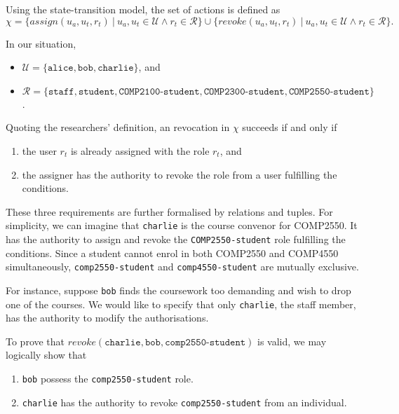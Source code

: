 \documentclass{article}
\begin{document}
Using the state-transition model, the set of actions\cite{formal-verification}
is defined as $$\chi = \{ \textit{assign}(u_{a}, u_{t}, r_{t})\ |\ u_{a}, u_{t}
\in \mathcal{U} \land r_{t} \in \mathcal{R} \} \cup \{ \textit{revoke}(u_{a},
u_{t}, r_{t})\ |\ u_{a}, u_{t} \in \mathcal{U} \land r_{t} \in \mathcal{R}
\}.$$

In our situation, \begin{itemize}
    \item $\mathcal{U} = \{ \texttt{alice}, \texttt{bob}, \texttt{charlie}
    \}$, and \item $\mathcal{R} = \{ \texttt{staff}, \texttt{student},
    \texttt{COMP2100-student}, \texttt{COMP2300-student},
    \texttt{COMP2550-student} \}$.
\end{itemize}

Quoting the researchers' definition, an revocation in $\chi$ succeeds if
and only if \begin{enumerate}
    \item the user $r_{t}$ is already assigned with the role $r_{t}$, and
    \item the assigner has the authority to revoke the role from a user
    fulfilling the conditions.
\end{enumerate} These three requirements are further formalised by relations
and tuples. For simplicity, we can imagine that \texttt{charlie} is the
course convenor for COMP2550. It has the authority to assign and revoke
the \texttt{COMP2550-student} role fulfilling the conditions. Since
a student cannot enrol in both COMP2550 and COMP4550 simultaneously,
\texttt{comp2550-student} and \texttt{comp4550-student} are mutually exclusive.

For instance, suppose \texttt{bob} finds the coursework too demanding
and wish to drop one of the courses. We would like to specify that only
\texttt{charlie}, the staff member, has the authority to modify the
authorisations.

To prove that $\textit{revoke}(\texttt{charlie}, \texttt{bob},
\texttt{comp2550-student})$ is valid, we may logically show that
\begin{enumerate}
    \item \texttt{bob} possess the \texttt{comp2550-student} role.  \item
    \texttt{charlie} has the authority to revoke \texttt{comp2550-student}
    from an individual.
\end{enumerate}
\end{document}
